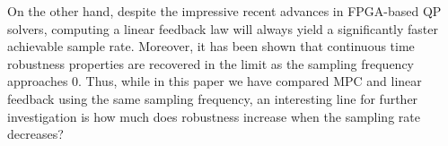 \documentclass[journal,twocolumn,twoside]{IEEEtran}
\begin{document}
On the other hand, despite the impressive recent advances in FPGA-based QP solvers, computing a linear feedback law will always yield a significantly faster achievable sample rate. Moreover, it has been shown that continuous time robustness properties are recovered in the limit as the sampling frequency approaches 0. Thus, while in this paper we have compared MPC and linear feedback using the same sampling frequency, an interesting line for further investigation is how much does robustness increase when the sampling rate decreases?






\renewcommand{\theequation}{A-\arabic{equation}}
\setcounter{equation}{0}  %
\setcounter{section}{0}
\end{document}
